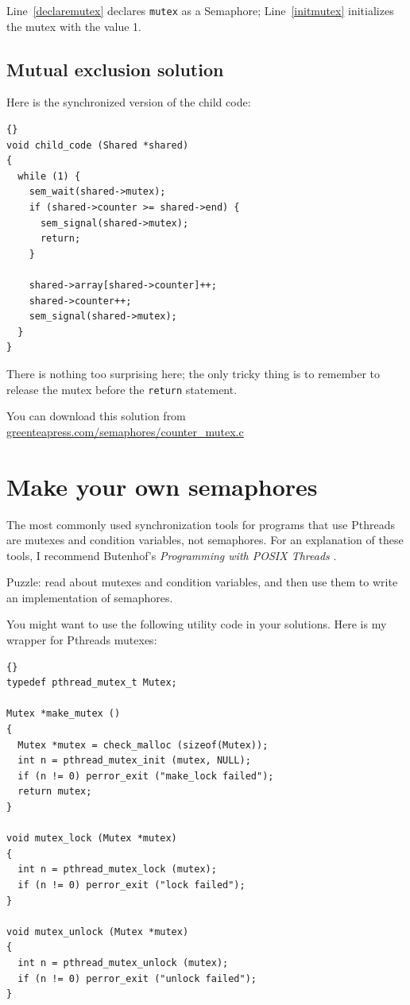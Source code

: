 \documentclass{book}
\newcommand{\clearemptydoublepage}{\newpage\cleardoublepage}
\begin{document}
Line~\ref{declaremutex} declares {\tt mutex} as a Semaphore;
Line~\ref{initmutex} initializes the mutex with the value 1.


\clearemptydoublepage
\subsection{Mutual exclusion solution}

Here is the synchronized version of the child code:

\begin{lstlisting}[title={}]{}
void child_code (Shared *shared)
{
  while (1) {
    sem_wait(shared->mutex);
    if (shared->counter >= shared->end) {
      sem_signal(shared->mutex);
      return;
    }

    shared->array[shared->counter]++;
    shared->counter++;
    sem_signal(shared->mutex);
  }
}
\end{lstlisting}

There is nothing too surprising here; the only tricky thing
is to remember to release the mutex before the {\tt return}
statement.

You can download this solution from 
\url{greenteapress.com/semaphores/counter_mutex.c}


\clearemptydoublepage
\section{Make your own semaphores}
\label{makeyourown}

The most commonly used synchronization tools for programs that use
Pthreads are mutexes and condition variables, not semaphores.  For an
explanation of these tools, I recommend Butenhof's {\em Programming
with POSIX Threads} \cite{butenhof}.

Puzzle: read about mutexes and condition variables, and then
use them to write an implementation of semaphores.

You might want to use the following utility code in your solutions.
Here is my wrapper for Pthreads mutexes:

\begin{lstlisting}[title={}]{}
typedef pthread_mutex_t Mutex;

Mutex *make_mutex ()
{
  Mutex *mutex = check_malloc (sizeof(Mutex));
  int n = pthread_mutex_init (mutex, NULL);
  if (n != 0) perror_exit ("make_lock failed"); 
  return mutex;
}

void mutex_lock (Mutex *mutex)
{
  int n = pthread_mutex_lock (mutex);
  if (n != 0) perror_exit ("lock failed");
}

void mutex_unlock (Mutex *mutex)
{
  int n = pthread_mutex_unlock (mutex);
  if (n != 0) perror_exit ("unlock failed");
}
\end{lstlisting}
\end{document}
